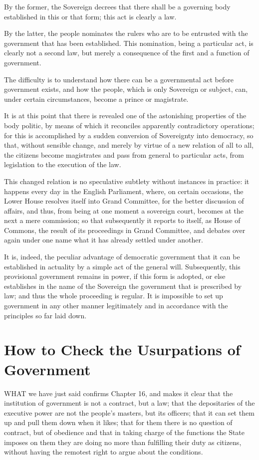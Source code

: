 \documentclass[12pt]{report}
\begin{document}
By the former, the Sovereign decrees that there shall be a governing body established in this or that form; this act is clearly a law.

By the latter, the people nominates the rulers who are to be entrusted with the government that has been established. This nomination, being a particular act, is clearly not a second law, but merely a consequence of the first and a function of government.

The difficulty is to understand how there can be a governmental act before government exists, and how the people, which is only Sovereign or subject, can, under certain circumstances, become a prince or magistrate.

It is at this point that there is revealed one of the astonishing properties of the body politic, by means of which it reconciles apparently contradictory operations; for this is accomplished by a sudden conversion of Sovereignty into democracy, so that, without sensible change, and merely by virtue of a new relation of all to all, the citizens become magistrates and pass from general to particular acts, from legislation to the execution of the law.

This changed relation is no speculative subtlety without instances in practice: it happens every day in the English Parliament, where, on certain occasions, the Lower House resolves itself into Grand Committee, for the better discussion of affairs, and thus, from being at one moment a sovereign court, becomes at the next a mere commission; so that subsequently it reports to itself, as House of Commons, the result of its proceedings in Grand Committee, and debates over again under one name what it has already settled under another.

It is, indeed, the peculiar advantage of democratic government that it can be established in actuality by a simple act of the general will. Subsequently, this provisional government remains in power, if this form is adopted, or else establishes in the name of the Sovereign the government that is prescribed by law; and thus the whole proceeding is regular. It is impossible to set up government in any other manner legitimately and in accordance with the principles so far laid down.

\section{How to Check the Usurpations of Government}
WHAT we have just said confirms Chapter 16, and makes it clear that the institution of government is not a contract, but a law; that the depositaries of the executive power are not the people's masters, but its officers; that it can set them up and pull them down when it likes; that for them there is no question of contract, but of obedience and that in taking charge of the functions the State imposes on them they are doing no more than fulfilling their duty as citizens, without having the remotest right to argue about the conditions.
\end{document}
